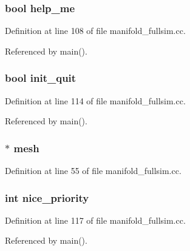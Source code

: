 \subsubsection[{help\_\-me}]{\setlength{\rightskip}{0pt plus 5cm}bool {\bf help\_\-me}}\label{manifold__fullsim_8cc_98b74f22826e26c7727ce84f6d3a621b}




Definition at line 108 of file manifold\_\-fullsim.cc.

Referenced by main().
\subsubsection[{init\_\-quit}]{\setlength{\rightskip}{0pt plus 5cm}bool {\bf init\_\-quit}}\label{manifold__fullsim_8cc_1d93ba7fce2ae0edcb3665632a12bd49}




Definition at line 114 of file manifold\_\-fullsim.cc.

Referenced by main().
\subsubsection[{mesh}]{$\ast$ {\bf mesh}}\label{manifold__fullsim_8cc_6e08f89b32254fb4b129720418e7c6ea}




Definition at line 55 of file manifold\_\-fullsim.cc.
\subsubsection[{nice\_\-priority}]{\setlength{\rightskip}{0pt plus 5cm}int {\bf nice\_\-priority}}\label{manifold__fullsim_8cc_1cb688b2b9eda644e545e25f039761e4}




Definition at line 117 of file manifold\_\-fullsim.cc.

Referenced by main().
